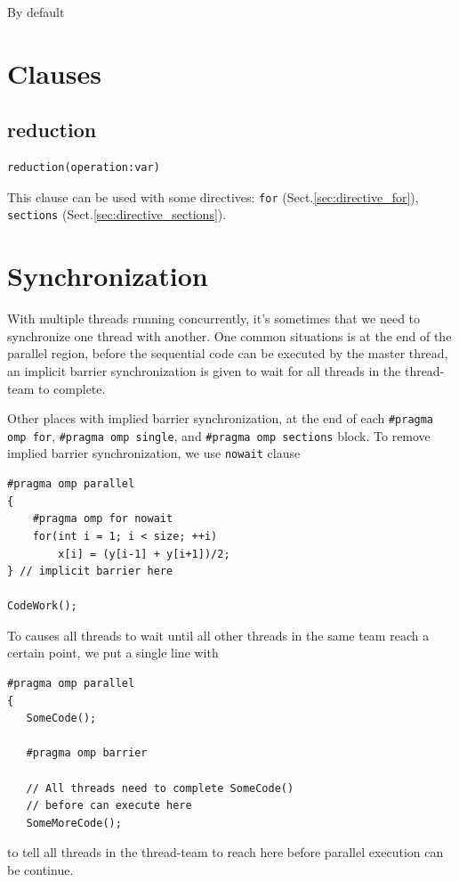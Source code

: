 By default

\section{Clauses}

\subsection{reduction}
\label{sec:clause_reduction}

\begin{verbatim}
reduction(operation:var)
\end{verbatim}


This clause can be used with some directives: \verb!for!
(Sect.\ref{sec:directive_for}), \verb!sections!
(Sect.\ref{sec:directive_sections}).


\section{Synchronization}

With multiple threads running concurrently, it's sometimes that we need to
synchronize one thread with another. One common situations is at the end of the
parallel region, before the sequential code can be executed by the master
thread, an implicit barrier synchronization is given to wait for all threads in
the thread-team to complete. 

Other places with implied barrier synchronization, at the end of each 
\verb!#pragma omp for!, \verb!#pragma omp single!, and 
\verb!#pragma omp sections! block. To remove implied barrier synchronization, we
use \verb!nowait! clause
\begin{verbatim}
#pragma omp parallel    
{
    #pragma omp for nowait
    for(int i = 1; i < size; ++i)
        x[i] = (y[i-1] + y[i+1])/2;
} // implicit barrier here

CodeWork();
\end{verbatim}

To causes all threads to wait until all other threads in the same team reach a
certain point, we put a single line with
\begin{verbatim}
#pragma omp parallel
{
   SomeCode();
   
   #pragma omp barrier
   
   // All threads need to complete SomeCode()
   // before can execute here
   SomeMoreCode();  
\end{verbatim}
to tell all threads in the thread-team to reach here before parallel execution
can be continue.
